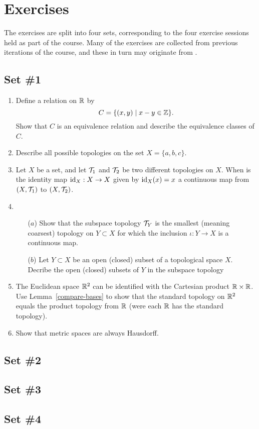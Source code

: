 \section{Exercises}
The exercises are split into four sets, corresponding to the four exercise sessions held as part of the course. Many of the exercises are collected from previous iterations of the course, and these in turn may originate from \cite{Hum}.

\subsection{Set \#1}

\begin{enumerate}
  \item Define a relation on $\mathbb{R}$ by
    \[
      C=\{(x,y) \mid x - y \in \mathbb{Z} \}.
    \]
    Show that $C$ is an equivalence relation and describe the equivalence classes of $C$.
  \item Describe all possible topologies on the set $X = \{a,b,c\}$.
  \item Let $X$ be a set, and let $\mathcal{T}_1$ and $\mathcal{T}_2$ be two different topologies on $X$. When is the identity map $\mathrm{id}_X : X \to X$ given by $\mathrm{id}_X(x) = x$ a continuous map from $(X,\mathcal{T}_1)$ to $(X,\mathcal{T}_2)$.
  \item \begin{itemize}
		\item[($a$)] Show that the subspace topology $\mathcal{T}_Y$ is the smallest (meaning coarsest) topology on $Y\subset X$ for which the inclusion $\iota:Y \rightarrow X$ is a continuous map.
		\item[($b$)] Let $Y\subset X$ be an open (closed) subset of a topological space $X$. Decribe the open (closed) subsets of $Y$ in the subspace topology
	\end{itemize}
    
  \item The Euclidean space $\mathbb{R}^2$ can be identified with the Cartesian product $\mathbb{R} \times \mathbb{R}$. Use Lemma~\ref{compare-bases} to show that the standard topology on $\mathbb{R}^2$ equals the product topology from $\mathbb{R}$ (were each $\mathbb{R}$ has the standard topology).
  
  \item \label{metric-Hausdorff} Show that metric spaces are always Hausdorff.
\end{enumerate}

\subsection{Set \#2}

\subsection{Set \#3}

\subsection{Set \#4}
